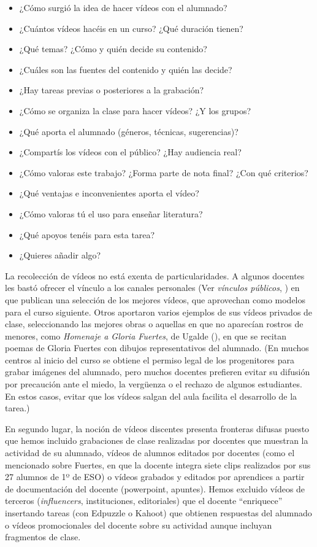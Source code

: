 \documentclass[spanish]{textolivre}
\begin{document}
\begin{itemize}
    \item ¿Cómo surgió la idea de hacer vídeos con el alumnado?
    \item ¿Cuántos vídeos hacéis en un curso? ¿Qué duración tienen?
    \item ¿Qué temas? ¿Cómo y quién decide su contenido?
    \item ¿Cuáles son las fuentes del contenido y quién las decide?
    \item ¿Hay tareas previas o posteriores a la grabación?
    \item ¿Cómo se organiza la clase para hacer vídeos? ¿Y los grupos?
    \item ¿Qué aporta el alumnado (géneros, técnicas, sugerencias)?
    \item ¿Compartís los vídeos con el público? ¿Hay audiencia real?
    \item ¿Cómo valoras este trabajo? ¿Forma parte de nota final? ¿Con qué criterios?
    \item ¿Qué ventajas e inconvenientes aporta el vídeo?
    \item ¿Cómo valoras tú el uso para enseñar literatura?
    \item ¿Qué apoyos tenéis para esta tarea?
    \item ¿Quieres añadir algo?
\end{itemize}

La recolección de vídeos no está exenta de particularidades. A algunos docentes les bastó ofrecer el vínculo a los canales personales (Ver \textit{vínculos públicos}, ) en que publican una selección de los mejores vídeos, que aprovechan como modelos para el curso siguiente. Otros aportaron varios ejemplos de sus vídeos privados de clase, seleccionando las mejores obras o aquellas en que no aparecían rostros de menores, como \textit{Homenaje a Gloria Fuertes}, de Ugalde (), en que se recitan poemas de Gloria Fuertes con dibujos representativos del alumnado. (En muchos centros al inicio del curso se obtiene el permiso legal de los progenitores para grabar imágenes del alumnado, pero muchos docentes prefieren evitar su difusión por precaución ante el miedo, la vergüenza o el rechazo de algunos estudiantes. En estos casos, evitar que los vídeos salgan del aula facilita el desarrollo de la tarea.)

En segundo lugar, la noción de vídeos discentes presenta fronteras difusas puesto que hemos incluido grabaciones de clase realizadas por docentes que muestran la actividad de su alumnado, vídeos de alumnos editados por docentes (como el mencionado sobre Fuertes, en que la docente integra siete clips realizados por sus 27 alumnos de 1º de ESO) o vídeos grabados y editados por aprendices a partir de documentación del docente (powerpoint, apuntes). Hemos excluido vídeos de terceros (\textit{influencers}, instituciones, editoriales) que el docente “enriquece” insertando tareas (con Edpuzzle o Kahoot) que obtienen respuestas del alumnado o vídeos promocionales del docente sobre su actividad aunque incluyan fragmentos de clase.
\end{document}
